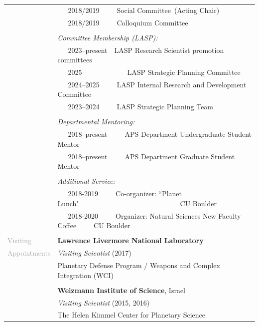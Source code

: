 \documentclass[letterpaper,10pt,twoside]{article}
\begin{document}
\begin{tabular}{@{} l l}
 & ~~~2018/2019~~~~~Social Committee~(Acting Chair)\\
 & ~~~2018/2019~~~~~Colloquium Committee \\
 & \\
 & \textit{Committee Membership (LASP):}\\
 & ~~~2023--present~~LASP Research Scientist promotion committees\\
 & ~~~2025~~~~~~~~~~~~~LASP Strategic Planning Committee\\
 & ~~~2024--2025~~~~~LASP Internal Research and Development Committee\\
 & ~~~2023--2024~~~~~LASP Strategic Planning Team\\
 & \\
 & \textit{Departmental Mentoring:}\\
 & ~~~2018--present~~~~~APS Department Undergraduate Student Mentor\\
 & ~~~2018--present~~~~~APS Department Graduate Student Mentor\\
 & \\
 & \textit{Additional Service:}\\
 & ~~~2018-2019~~~~~Co-organizer: ``Planet Lunch"~~~~~~~~~~~~~~~~~~~~~~~~~~~~~CU Boulder\\
 & ~~~2018-2020~~~~~Organizer: Natural Sciences New Faculty Coffee~~~~~CU Boulder\\
 & \\
\large{\textcolor{darkgray}{Visiting}} & \textbf{Lawrence Livermore National Laboratory} \\
\large{\textcolor{darkgray}{Appointments}} & \textit{Visiting Scientist} (2017) \\
 & \hspace{0.25in} Planetary Defense Program / Weapons and Complex Integration (WCI) \\
 & \\
 & \textbf{Weizmann Institute of Science}, Israel \\
 & \textit{Visiting Scientist} (2015, 2016) \\
 & \hspace{0.25in} The Helen Kimmel Center for Planetary Science \\
\end{tabular}

\vspace{0.05in}
\end{document}
